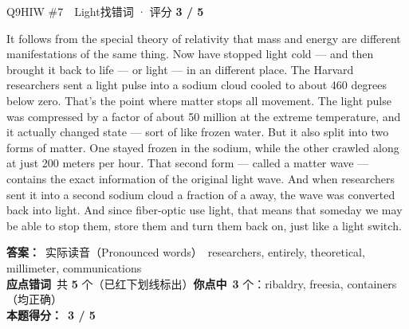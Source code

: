 \begin{qblock}{Q9\quad HIW \#7\ \ Light}{找错词 · 评分 \textcolor{cAccent}{\bfseries 3 / 5}}
\begin{promptbox}
It follows from the special theory of relativity that mass and energy are different manifestations of the same thing. Now  have stopped light cold --- and then brought it back to life --- or light --- in an  different place. The Harvard researchers sent a light pulse into a sodium cloud cooled to about 460 degrees below zero. That's the  point where matter stops all movement. The light pulse was compressed by a factor of about 50 million at the extreme temperature, and it actually changed state --- sort of like frozen water. But it also split into two forms of matter. One stayed frozen in the sodium, while the other crawled along at just 200 meters per hour. That second form --- called a matter wave --- contains the exact information of the original light wave. And when researchers sent it into a second sodium cloud a fraction of a  away, the wave was converted back into light. And since fiber-optic  use light, that means that someday we may be able to stop them, store them and turn them back on, just like a light switch.
\end{promptbox}
\par\smallskip
\textbf{答案：}\ 实际读音（Pronounced words）\ {\color{cFix}researchers, entirely, theoretical, millimeter, communications}\\
\textbf{应点错词}\ 共 \textbf{5} 个（已红下划线标出）\qquad\textbf{你点中}\ \textbf{3} 个：ribaldry, freesia, containers（均正确）\\[2pt]\textbf{本题得分：}\ {\color{cAccent}\bfseries 3 / 5}
\end{qblock}

